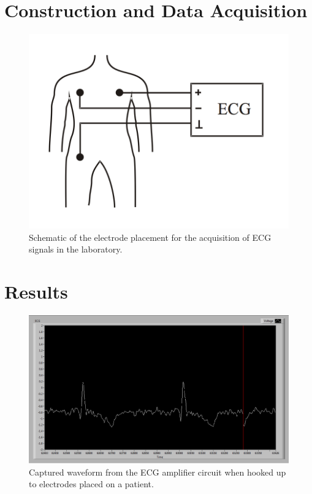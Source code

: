 \documentclass[pdftex,12pt,letterpaper]{article}
\begin{document}
\section{Construction and Data Acquisition}

\begin{figure}[H]
\begin{center}
\includegraphics[scale=.5]{setup.png}
\caption{Schematic of the electrode placement for the acquisition of ECG signals in the laboratory.}
\label{fig:setup}
\end{center}
\end{figure}

\section{Results}

\begin{figure}[H]
\begin{center}
\includegraphics[scale=.4]{ECG_real.png}
\caption{Captured waveform from the ECG amplifier circuit when hooked up to electrodes placed on a patient.}
\label{fig:ECG}
\end{center}
\end{figure}
\end{document}
